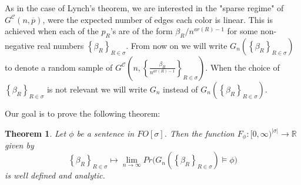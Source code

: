 \documentclass[12pt,notitlepage,a4paper]{article}
\newtheorem{theorem}{Theorem}[section]
\theoremstyle{definition}
\newcommand{\R}{\mathbb{R}}
\newcommand{\Ln}{\lim\limits_{n\to \infty}}
\newcommand{\InR}[1]{\left\{ #1_R \right\}_{R\in \sigma}}
\begin{document}
As in the case of Lynch's theorem, we are interested in the
"sparse regime" of $G^\mathcal{C}(n,\overline{p})$, were the 
expected number of edges each color is linear. 
This is achieved when each of the $p_R$'s are 
of the form $\beta_R/n^{ar(R)-1}$ for some 
non-negative real numbers $\InR{\beta}$.
From now on we will write $G_n\left(\InR{\beta}\right)$
to denote a random sample of 
$G^\mathcal{C}\left(n,\left\{ \frac{
\beta_R}{n^{ar(R)-1}}\right\}_{R\in\sigma}\right)$.
When the choice of $\InR{\beta}$ is not relevant
we will write $G_n$ instead of 
$G_n\left(\InR{\beta}\right)$.\par

Our goal is to prove the following theorem:

\begin{theorem} \label{thm:main}
	Let $\phi$ be a sentence in $FO[\sigma]$. Then
	the function
	$F_\phi: [0,\infty)^{|\sigma|}
	\rightarrow \R$ given by 
	\[
	\InR{\beta} \mapsto \Ln Pr\big( G_n\left(
	\InR{\beta}\right) \models \phi\big)
	\]
	is well defined and analytic. 
\end{theorem}
\end{document}
